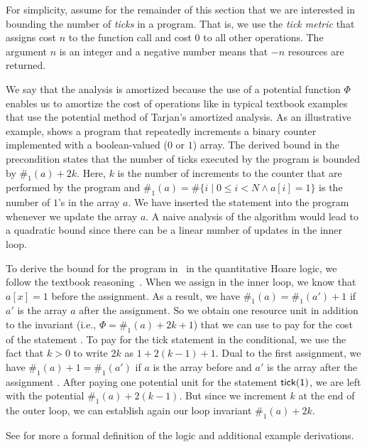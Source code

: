 \documentclass[nocopyrightspace,preprint]{sigplanconf}
\newcommand{\pref}[1]{\prettyref{#1}}
\begin{document}
For simplicity, assume for the remainder of this section that we are
interested in bounding the number of \emph{ticks} in a program.  That
is, we use the \emph{tick metric} that assigns cost $n$ to the function call
 and cost $0$ to all other operations.  The argument $n$
is an integer and a negative number means that $-n$ resources are
returned.

We say that the analysis is amortized because the use of a potential
function $\Phi$ enables us to amortize the cost of operations like in
typical textbook examples that use the potential method of Tarjan's
amortized analysis.  As an illustrative example, \pref{fig:xmplinc}
shows a program that repeatedly increments a binary counter
implemented with a boolean-valued ($0$ or $1$) array.  The derived
bound in the precondition states that the number of ticks
executed by the program is bounded by $\#_1(a) + 2k$.  Here, $k$ is
the number of increments to the counter that are performed by the
program and $ \#_1(a) = \# \{ i \mid 0 \le i < N \land a[i] = 1 \}$ is
the number of $1$'s in the array $a$.  We have inserted the statement
 into the program whenever we update the array $a$.  A
naive analysis of the algorithm would lead to a quadratic bound since
there can be a linear number of updates in the inner loop.

To derive the bound for the program in~\pref{fig:xmplinc} in the
quantitative Hoare logic, we follow the textbook
reasoning~\cite{Algorithms}.  When we assign  in the
inner loop, we know that $a[x]=1$ before the assignment.  As a result,
we have $\#_1(a) = \#_1(a') + 1$ if $a'$ is the array $a$ after the
assignment.  So we obtain one resource unit in addition to the
invariant (i.e., $\Phi = \#_1(a) + 2k + 1$) that we can use to pay for the
cost of the statement .  To pay for the tick statement
in the conditional, we use the fact that $k>0$ to write $2k$ as $1 +
2(k-1) +1$.  Dual to the first assignment, we have $\#_1(a) +1 =
\#_1(a')$ if $a$ is the array before and $a'$ is the array after the
assignment .  After paying one potential unit for the
statement $\mathsf{tick(1)}$, we are left with the potential $\#_1(a) +
2(k - 1)$.  But since we increment $k$ at the end of the outer loop,
we can establish again our loop invariant $\#_1(a) + 2k$.

See \pref{sec:logic} for more a formal definition of the logic and
additional example derivations.
\end{document}
